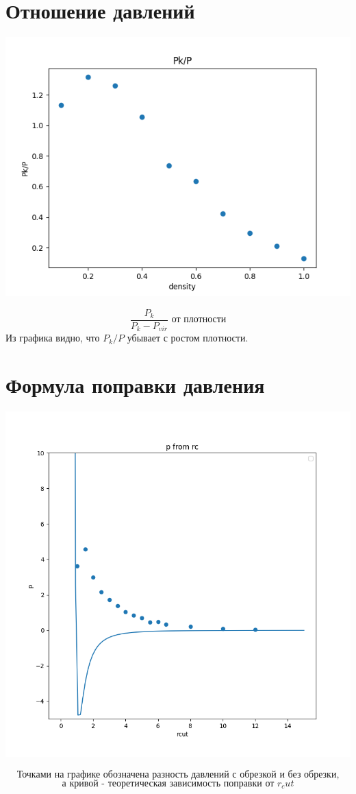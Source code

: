 \documentclass[a4paper, 12pt]{article}
\begin{document}
\section{Отношение давлений}
\begin{center}
\includegraphics[scale=0.6]{pk}
\end{center}
\[\frac{P_k}{P_k - P_{vir}} \textit{ от плотности}\]
Из графика видно, что $P_k / P$ убывает с ростом плотности.

\section{Формула поправки давления}
\begin{center}
\includegraphics[scale=0.8]{pcor}
\end{center}
\[\textit{Точками на графике обозначена разность давлений с обрезкой и без обрезки,}\]
\[\textit{а кривой - теоретическая зависимость поправки от }r_cut\]
\end{document}
